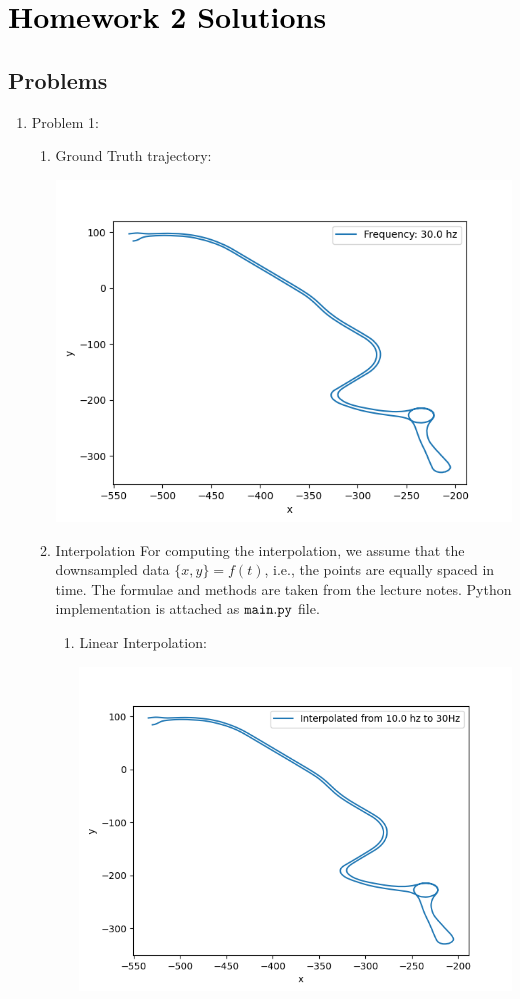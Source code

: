 \documentclass[10pt,letterpaper]{article}
\theoremstyle{definition}
\theoremstyle{remark}
\def\thetitle{\textcolor{black}{Homework 2 Solutions}}
\begin{document}
\section*{\thetitle}

\subsection*{Problems}
\begin{enumerate}[leftmargin=*,itemsep=9ex]
  \item Problem 1:
  \begin{enumerate}[1., itemsep=5ex]
    \item Ground Truth trajectory:
    \begin{center}
      \includegraphics[scale = 0.7]{fig/gt.png}
    \end{center}
    \item Interpolation
    For computing the interpolation, we assume that the downsampled data $\{x,y\} = f(t)$, i.e., the points are equally spaced in time.
    The formulae and methods are taken from the lecture notes. Python implementation is attached as $\tt{main.py}$ file.
    \begin{enumerate}[itemsep=5ex]
      \item Linear Interpolation:
      \begin{center}
        \includegraphics[width=0.32\linewidth]{fig/lin_10.png}

\end{center}
\end{enumerate}
\end{enumerate}
\end{enumerate}
\end{document}
